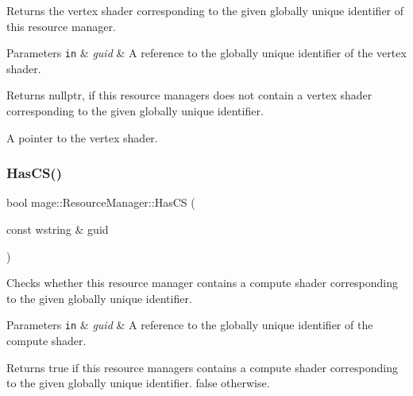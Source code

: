 Returns the vertex shader corresponding to the given globally unique identifier of this resource manager.


\begin{DoxyParams}[1]{Parameters}
\mbox{\tt in}  & {\em guid} & A reference to the globally unique identifier of the vertex shader. \\
\hline
\end{DoxyParams}
\begin{DoxyReturn}{Returns}
{\ttfamily nullptr}, if this resource managers does not contain a vertex shader corresponding to the given globally unique identifier. 

A pointer to the vertex shader. 
\end{DoxyReturn}
\hypertarget{classmage_1_1_resource_manager_a697c9c96fbf9d4f0382e769d4872aabb}{}\label{classmage_1_1_resource_manager_a697c9c96fbf9d4f0382e769d4872aabb} 
\subsubsection{\texorpdfstring{Has\+C\+S()}{HasCS()}}
{\footnotesize\ttfamily bool mage\+::\+Resource\+Manager\+::\+Has\+CS (\begin{DoxyParamCaption}\item[{const wstring \&}]{guid }\end{DoxyParamCaption})\hspace{0.3cm}{\ttfamily [noexcept]}}

Checks whether this resource manager contains a compute shader corresponding to the given globally unique identifier.


\begin{DoxyParams}[1]{Parameters}
\mbox{\tt in}  & {\em guid} & A reference to the globally unique identifier of the compute shader. \\
\hline
\end{DoxyParams}
\begin{DoxyReturn}{Returns}
{\ttfamily true} if this resource managers contains a compute shader corresponding to the given globally unique identifier. {\ttfamily false} otherwise. 
\end{DoxyReturn}
\hypertarget{classmage_1_1_resource_manager_a9056d3cccb543acfbc48554adb80413e}{}\label{classmage_1_1_resource_manager_a9056d3cccb543acfbc48554adb80413e} 
